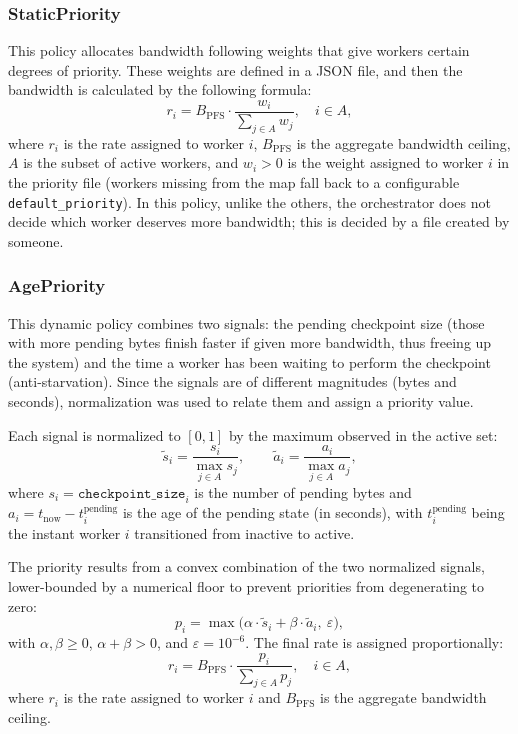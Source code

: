 \documentclass[sigplan,twocolumn,10pt,nonacm]{acmart}
\begin{document}
\subsubsection{StaticPriority}
\label{sec:policy-static}

This policy allocates bandwidth following weights that give workers certain degrees of priority. These weights are defined in a JSON file, and then the bandwidth is calculated by the following formula:\begin{equation}
    r_i = B_{\text{PFS}} \cdot \frac{w_i}{\sum_{j \in A} w_j}, \quad i \in A,
    \label{eq:static-priority}
\end{equation}
where $r_i$ is the rate assigned to worker $i$, $B_{\text{PFS}}$ is the aggregate bandwidth ceiling, $A$ is the subset of active workers, and $w_i > 0$ is the weight assigned to worker $i$ in the priority file (workers missing from the map fall back to a configurable \texttt{default\_priority}). In this policy, unlike the others, the orchestrator does not decide which worker deserves more bandwidth; this is decided by a file created by someone.
\subsubsection{AgePriority}
\label{sec:policy-age}

This dynamic policy combines two signals: the pending checkpoint size (those with more pending bytes finish faster if given more bandwidth, thus freeing up the system) and the time a worker has been waiting to perform the checkpoint (anti-starvation). Since the signals are of different magnitudes (bytes and seconds), normalization was used to relate them and assign a priority value.

Each signal is normalized to $[0, 1]$ by the maximum observed in the active set:
\begin{equation}
    \tilde{s}_i = \frac{s_i}{\max_{j \in A} s_j}, \qquad
    \tilde{a}_i = \frac{a_i}{\max_{j \in A} a_j},
    \label{eq:age-norm}
\end{equation}
where $s_i = \texttt{checkpoint\_size}_i$ is the number of pending bytes and $a_i = t_{\text{now}} - t^{\text{pending}}_i$ is the age of the pending state (in seconds), with $t^{\text{pending}}_i$ being the instant worker $i$ transitioned from inactive to active.

The priority results from a convex combination of the two normalized signals, lower-bounded by a numerical floor to prevent priorities from degenerating to zero:
\begin{equation}
    p_i = \max\!\bigl(\alpha \cdot \tilde{s}_i + \beta \cdot \tilde{a}_i,\ \varepsilon\bigr),
    \label{eq:age-priority-weight}
\end{equation}
with $\alpha, \beta \geq 0$, $\alpha + \beta > 0$, and $\varepsilon = 10^{-6}$. The final rate is assigned proportionally:
\begin{equation}
    r_i = B_{\text{PFS}} \cdot \frac{p_i}{\sum_{j \in A} p_j}, \quad i \in A,
    \label{eq:age-priority-rate}
\end{equation}
where $r_i$ is the rate assigned to worker $i$ and $B_{\text{PFS}}$ is the aggregate bandwidth ceiling.
\end{document}
